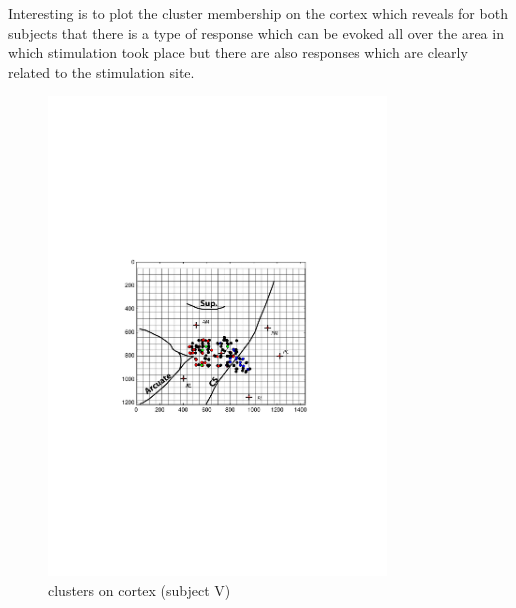 Interesting is to plot the cluster membership on the cortex which reveals for both subjects that there is a type of response which can be evoked all over the area in which stimulation took place but there are also responses which are clearly related to the stimulation site. 
\begin{figure}[ht]
    \centering
        \includegraphics[width=0.8\textwidth]{images/cluster_vega.pdf}
    \caption{clusters on cortex (subject V)}
    \label{sg:fig:images_cluster_vega}
\end{figure}
